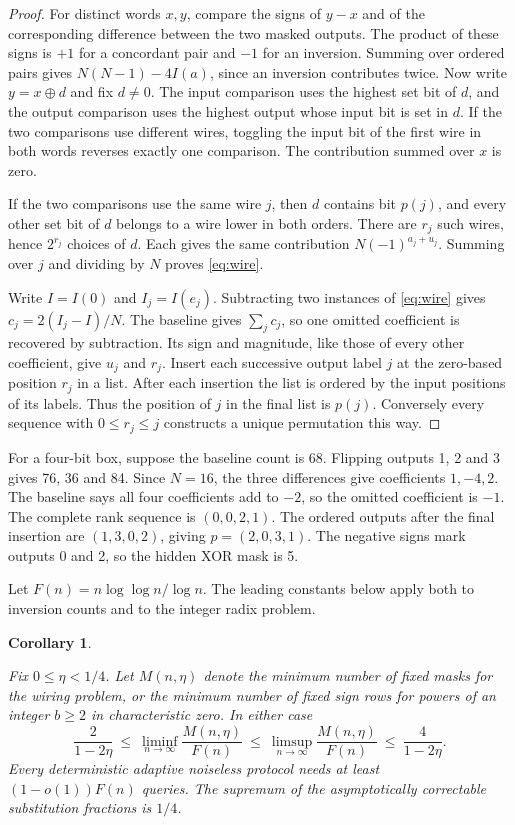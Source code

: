 \documentclass[11pt,letterpaper]{article}
\newtheorem{corollary}[theorem]{Corollary}
\numberwithin{equation}{section}
\begin{document}
\begin{proof}

For distinct words $x,y$, compare the signs of $y-x$ and of the corresponding difference
between the two masked outputs. The product of these signs is $+1$ for a concordant pair and
$-1$ for an inversion. Summing over ordered pairs gives $N(N-1)-4I(a)$, since an inversion
contributes twice. Now write $y=x\mathbin{\oplus}d$ and fix $d\ne0$. The input comparison uses
the highest set bit of $d$, and the output comparison uses the highest output whose input bit
is set in $d$. If the two comparisons use different wires, toggling the input bit of the first
wire in both words reverses exactly one comparison. The contribution summed over $x$ is zero.

If the two comparisons use the same wire $j$, then $d$ contains bit $p(j)$, and every other
set bit of $d$ belongs to a wire lower in both orders. There are $r_j$ such wires, hence
$2^{r_j}$ choices of $d$. Each gives the same contribution $N(-1)^{a_j+u_j}$. Summing over $j$
and dividing by $N$ proves \eqref{eq:wire}.

Write $I=I(0)$ and $I_j=I(e_j)$. Subtracting two instances of \eqref{eq:wire} gives
$c_j=2(I_j-I)/N$. The baseline gives $\sum_j c_j$, so one omitted coefficient is recovered by
subtraction. Its sign and magnitude, like those of every other coefficient, give $u_j$ and
$r_j$. Insert each successive output label $j$ at the zero-based position $r_j$ in a list.
After each insertion the list is ordered by the input positions of its labels. Thus the
position of $j$ in the final list is $p(j)$. Conversely every sequence with $0\le r_j\le j$
constructs a unique permutation this way.
\end{proof}

For a four-bit box, suppose the baseline count is 68. Flipping outputs 1, 2 and 3 gives 76, 36
and 84. Since $N=16$, the three differences give coefficients $1,-4,2$. The baseline says all
four coefficients add to $-2$, so the omitted coefficient is $-1$. The complete rank sequence
is $(0,0,2,1)$. The ordered outputs after the final insertion are $(1,3,0,2)$, giving
$p=(2,0,3,1)$. The negative signs mark outputs 0 and 2, so the hidden XOR mask is 5.

Let $F(n)=n\log\log n/\log n$. The leading constants below apply both to inversion counts and to the integer radix problem.

\begin{corollary}\label{cor:rate}

Fix $0\le\eta<1/4$. Let $M(n,\eta)$ denote the minimum number of fixed masks for the wiring
problem, or the minimum number of fixed sign rows for powers of an integer $b\ge2$ in
characteristic zero. In either case
\[
\frac{2}{1-2\eta}\ \le\
\liminf_{n\to\infty}\frac{M(n,\eta)}{F(n)}
\ \le\ \limsup_{n\to\infty}\frac{M(n,\eta)}{F(n)}
\ \le\ \frac{4}{1-2\eta}.
\]
Every deterministic adaptive noiseless protocol needs at least $(1-o(1))F(n)$ queries. The
supremum of the asymptotically correctable substitution fractions is $1/4$.
\end{corollary}
\end{document}
